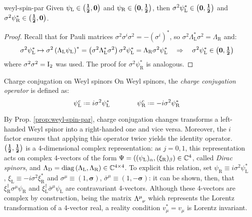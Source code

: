 \begin{proposition}{}{weyl-spin-par}
  Given $ \psi_\text{L} \in \mathbf{\left( \frac{1}{2},0 \right)} $ and $ \psi_\text{R} \in \mathbf{\left( 0,\frac{1}{2} \right)} $, then $ \sigma^2 \psi_\text{L}^* \in \mathbf{\left( 0,\frac{1}{2} \right)} $ and $ \sigma^2 \psi_\text{R}^* \in \mathbf{\left( \frac{1}{2},0 \right)} $.

  \tcblower

  \begin{proof}
    Recall that for Pauli matrices $ \sigma^2 \sigma^i \sigma^2 = -(\sigma^i)^* $, so $ \sigma^2 \Lambda_\text{L}^* \sigma^2 = \Lambda_\text{R} $ and:
    \begin{equation*}
      \sigma^2 \psi_\text{L}^* \mapsto \sigma^2 \left( \Lambda_\text{L} \psi_\text{L} \right)^* = \left( \sigma^2 \Lambda_\text{L}^* \sigma^2 \right) \sigma^2 \psi_\text{L}^* = \Lambda_\text{R} \sigma^2 \psi_\text{L}^*
      \quad \Rightarrow \quad
      \sigma^2 \psi_\text{L}^* \in \mathbf{\left( 0,\tfrac{1}{2} \right)}
    \end{equation*}
    where $ \sigma^2 \sigma^2 = \mathrm{I}_2 $ was used. The proof for $ \sigma^2 \psi_\text{R}^* $ is analogous.
  \end{proof}
\end{proposition}

\begin{definition}{Charge conjugation on Weyl spinors}{}
  On Weyl spinors, the \textit{charge conjugation operator} is defined as:
  \begin{equation}
    \psi_\text{L}^c \defeq i \sigma^2 \psi_\text{L}^*
    \qquad \qquad
    \psi_\text{R}^c \defeq -i \sigma^2 \psi_\text{R}^*
    \label{eq:1.42}
  \end{equation}
\end{definition}

By Prop. \ref{prop:weyl-spin-par}, charge conjugation changes transforms a left-handed Weyl spinor into a right-handed one and vice versa. Moreover, the $ i $ factor ensures that applying this operator twice yields the identity operator.\\
$ \mathbf{\left( \frac{1}{2},\frac{1}{2} \right)} $ is a 4-dimensional complex representation: as $ j = 0,1 $, this representation acts on complex 4-vectors of the form $ \Psi = \left( (\psi_\text{L})_\alpha, (\xi_\text{R})_\beta \right) \in \mathbb{C}^4 $, called \textit{Dirac spinors}, and $ \Lambda_\text{D} = \operatorname{diag} \left( \Lambda_\text{L}, \Lambda_\text{R} \right) \in \mathbb{C}^{4 \times 4} $. To explicit this relation, set $ \psi_\text{R} \equiv i \sigma^2 \psi_\text{L}^* $, $ \xi_\text{L} \equiv -i \sigma^2 \xi_\text{R}^* $ and $ \sigma^\mu \equiv \left( 1, \boldsymbol{\sigma} \right) $, $ \bar\sigma^\mu \equiv \left( 1, -\boldsymbol{\sigma} \right) $: it can be shown, then, that $ \xi_\text{R}^\dagger \sigma^\mu \psi_\text{R} $ and $ \xi_\text{L}^\dagger \bar\sigma^\mu \psi_\text{L} $ are contravariant 4-vectors. Although these 4-vectors are complex by construction, being the matrix $ \tensor{\Lambda}{^\mu_\nu} $ which represents the Lorentz transformation of a 4-vector real, a reality condition $ v_\mu^* = v_\mu $ is Lorentz invariant.


